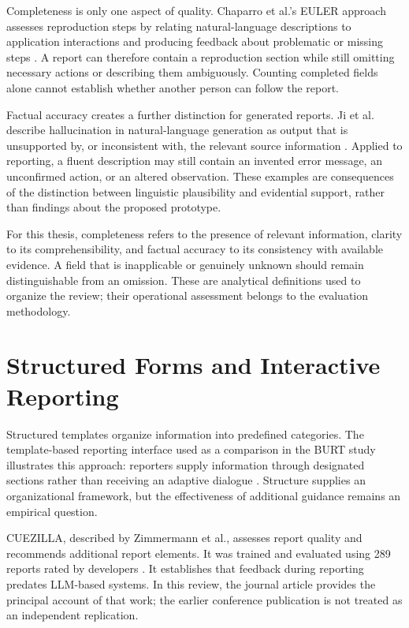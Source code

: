 Completeness is only one aspect of quality. Chaparro et al.'s EULER approach assesses reproduction steps by relating natural-language descriptions to application interactions and producing feedback about problematic or missing steps \cite{chaparro2019}. A report can therefore contain a reproduction section while still omitting necessary actions or describing them ambiguously. Counting completed fields alone cannot establish whether another person can follow the report.

Factual accuracy creates a further distinction for generated reports. Ji et al. describe hallucination in natural-language generation as output that is unsupported by, or inconsistent with, the relevant source information \cite{ji2023}. Applied to reporting, a fluent description may still contain an invented error message, an unconfirmed action, or an altered observation. These examples are consequences of the distinction between linguistic plausibility and evidential support, rather than findings about the proposed prototype.

For this thesis, completeness refers to the presence of relevant information, clarity to its comprehensibility, and factual accuracy to its consistency with available evidence. A field that is inapplicable or genuinely unknown should remain distinguishable from an omission. These are analytical definitions used to organize the review; their operational assessment belongs to the evaluation methodology.

\section{Structured Forms and Interactive Reporting}

Structured templates organize information into predefined categories. The template-based reporting interface used as a comparison in the BURT study illustrates this approach: reporters supply information through designated sections rather than receiving an adaptive dialogue \cite{song2022}. Structure supplies an organizational framework, but the effectiveness of additional guidance remains an empirical question.

CUEZILLA, described by Zimmermann et al., assesses report quality and recommends additional report elements. It was trained and evaluated using 289 reports rated by developers \cite{zimmermann2010}. It establishes that feedback during reporting predates LLM-based systems. In this review, the journal article provides the principal account of that work; the earlier conference publication is not treated as an independent replication.

